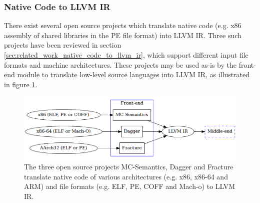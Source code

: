 
\subsubsection{Native Code to LLVM IR}
\label{sec:design_native_code_to_llvm_ir}

There exist several open source projects which translate native code (e.g. x86 assembly of shared libraries in the PE file format) into LLVM IR. Three such projects have been reviewed in section \ref{sec:related_work_native_code_to_llvm_ir}, which support different input file formats and machine architectures. These projects may be used as-is by the front-end module to translate low-level source languages into LLVM IR, as illustrated in figure \ref{fig:front-end_binary}.

\begin{figure}[htbp]
	\begin{center}
		\includegraphics[width=\textwidth]{inc/6_design/front-end_binary.png}
		\caption{The three open source projects MC-Semantics, Dagger and Fracture translate native code of various architectures (e.g. x86, x86-64 and ARM) and file formats (e.g. ELF, PE, COFF and Mach-o) to LLVM IR.}
		\label{fig:front-end_binary}
	\end{center}
\end{figure}
